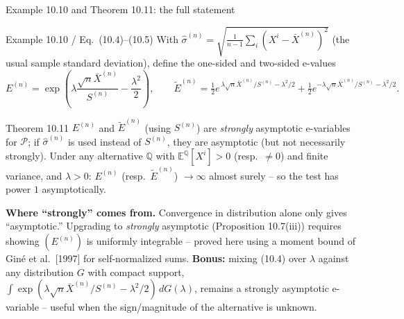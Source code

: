 \documentclass[aspectratio=169,10pt]{beamer}
\newcommand{\E}{\mathbb{E}}
\newcommand{\Qb}{\mathbb{Q}}
\newcommand{\calP}{\mathcal{P}}
\begin{document}
\begin{frame}{Example 10.10 and Theorem 10.11: the full statement}
  \begin{block}{Example 10.10 / Eq.\ (10.4)--(10.5)}
    With $\hat\sigma^{(n)} = \sqrt{\frac{1}{n-1}\sum_i (X^i-\bar X^{(n)})^2}$ (the usual sample standard deviation), define the one-sided and two-sided e-values
    \[
      E^{(n)} = \exp\!\left(\lambda\frac{\sqrt n \bar X^{(n)}}{S^{(n)}} - \frac{\lambda^2}{2}\right), \qquad
      \tilde E^{(n)} = \tfrac12 e^{\,\lambda \sqrt n \bar X^{(n)}/S^{(n)} - \lambda^2/2} + \tfrac12 e^{-\lambda \sqrt n \bar X^{(n)}/S^{(n)} - \lambda^2/2}.
    \]
  \end{block}
  \begin{block}{Theorem 10.11}
    $E^{(n)}$ and $\tilde E^{(n)}$ (using $S^{(n)}$) are \emph{strongly} asymptotic e-variables for $\calP$; if $\hat\sigma^{(n)}$ is used instead of $S^{(n)}$, they are asymptotic (but not necessarily strongly). Under any alternative $\Qb$ with $\E^{\Qb}[X^i]>0$ (resp.\ $\neq0$) and finite variance, and $\lambda>0$: $E^{(n)}$ (resp.\ $\tilde E^{(n)}$) $\to\infty$ almost surely -- so the test has power $1$ asymptotically.
  \end{block}
  \textbf{Where ``strongly'' comes from.} Convergence in distribution alone only gives ``asymptotic.'' Upgrading to \emph{strongly} asymptotic (Proposition 10.7(iii)) requires showing $(E^{(n)})$ is uniformly integrable -- proved here using a moment bound of Gin\'e et al.\ [1997] for self-normalized sums.
  \textbf{Bonus:} mixing (10.4) over $\lambda$ against any distribution $G$ with compact support, $\int \exp(\lambda\sqrt n\bar X^{(n)}/S^{(n)} - \lambda^2/2)\,dG(\lambda)$, remains a strongly asymptotic e-variable -- useful when the sign/magnitude of the alternative is unknown.
\end{frame}
\end{document}
